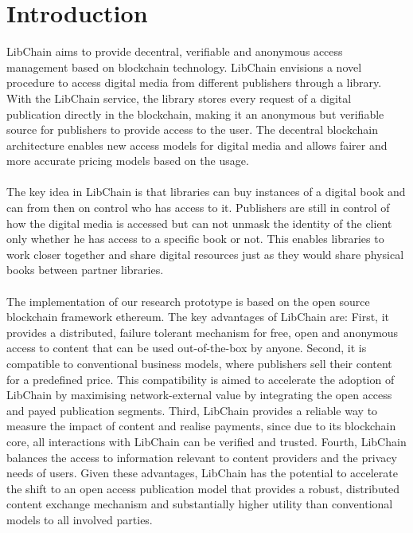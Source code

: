 \chapter{Introduction\label{cha:introduction}}
LibChain aims to provide decentral, verifiable and anonymous access management based on blockchain technology. LibChain envisions a novel procedure to access digital media from different publishers through a library.  With the LibChain service, the library stores every request of a digital publication directly in the blockchain, making it an anonymous but verifiable source for publishers to provide access to the user. The decentral blockchain architecture enables new access models for digital media and allows fairer and more accurate pricing models based on the usage. 
\\
\\
The key idea in LibChain is that libraries can buy instances of a digital book and can from then on control who has access to it. Publishers are still in control of how the digital media is accessed but can not unmask the identity of the client only whether he has access to a specific book or not. This enables libraries to work closer together and share digital resources just as they would share physical books between partner libraries.
\\
\\
The implementation of our research prototype is based on the open source blockchain framework ethereum. The key advantages of LibChain are: First, it provides a distributed, failure tolerant mechanism for free, open and anonymous access to content that can be used out-of-the-box by anyone. Second, it is compatible to conventional business models, where publishers sell their content for a predefined price. This compatibility is aimed to accelerate the adoption of LibChain by maximising network-external value by integrating the open access and payed publication segments. Third, LibChain provides a reliable way to measure the impact of content and realise payments, since due to its blockchain core, all interactions with LibChain can be verified and trusted. Fourth, LibChain balances the access to information relevant to content providers and the privacy needs of users. Given these advantages, LibChain has the potential to accelerate the shift to an open access publication model that provides a robust, distributed content exchange mechanism and substantially higher utility than conventional models to all involved parties.


